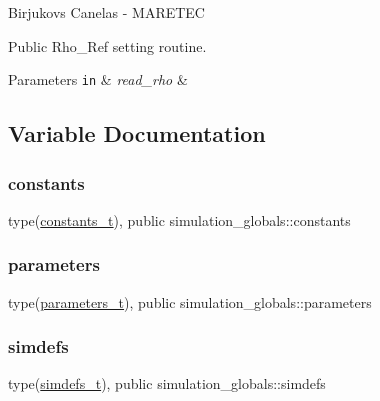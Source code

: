 Birjukovs Canelas -\/ M\+A\+R\+E\+T\+EC 

Public Rho\+\_\+\+Ref setting routine. 
\begin{DoxyParams}[1]{Parameters}
\mbox{\tt in}  & {\em read\+\_\+rho} & \\
\hline
\end{DoxyParams}


\subsection{Variable Documentation}
\mbox{\label{namespacesimulation__globals_aa3e1a54abbb08d2c09978a3509ec4303}} 
\subsubsection{\texorpdfstring{constants}{constants}}
{\footnotesize\ttfamily type(\mbox{\hyperlink{structsimulation__globals_1_1constants__t}{constants\+\_\+t}}), public simulation\+\_\+globals\+::constants}

\mbox{\label{namespacesimulation__globals_ac23e87cbb2256792d683ab1bf5dc5e21}} 
\subsubsection{\texorpdfstring{parameters}{parameters}}
{\footnotesize\ttfamily type(\mbox{\hyperlink{structsimulation__globals_1_1parameters__t}{parameters\+\_\+t}}), public simulation\+\_\+globals\+::parameters}

\mbox{\label{namespacesimulation__globals_ae851f977b442737307cd4bb76f2f68be}} 
\subsubsection{\texorpdfstring{simdefs}{simdefs}}
{\footnotesize\ttfamily type(\mbox{\hyperlink{structsimulation__globals_1_1simdefs__t}{simdefs\+\_\+t}}), public simulation\+\_\+globals\+::simdefs}

